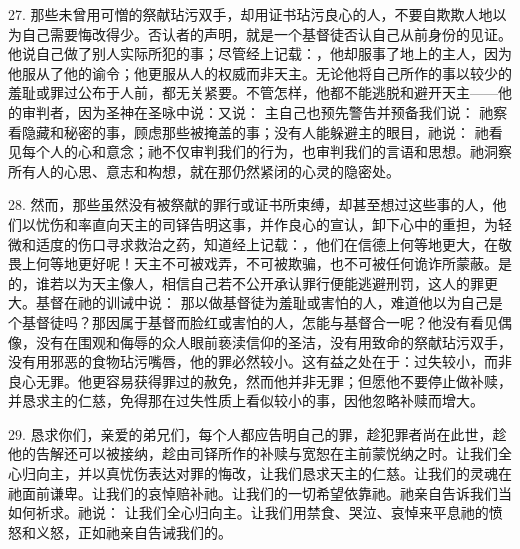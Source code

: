 27. 那些未曾用可憎的祭献玷污双手，却用证书玷污良心的人，不要自欺欺人地以为自己需要悔改得少。否认者的声明，就是一个基督徒否认自己从前身份的见证。他说自己做了别人实际所犯的事；尽管经上记载：，他却服事了地上的主人，因为他服从了他的谕令；他更服从人的权威而非天主。无论他将自己所作的事以较少的羞耻或罪过公布于人前，都无关紧要。不管怎样，他都不能逃脱和避开天主——他的审判者，因为圣神在圣咏中说：又说： 主自己也预先警告并预备我们说： 祂察看隐藏和秘密的事，顾虑那些被掩盖的事；没有人能躲避主的眼目，祂说： 祂看见每个人的心和意念；祂不仅审判我们的行为，也审判我们的言语和思想。祂洞察所有人的心思、意志和构想，就在那仍然紧闭的心灵的隐密处。\par

28. 然而，那些虽然没有被祭献的罪行或证书所束缚，却甚至想过这些事的人，他们以忧伤和率直向天主的司铎告明这事，并作良心的宣认，卸下心中的重担，为轻微和适度的伤口寻求救治之药，知道经上记载：，他们在信德上何等地更大，在敬畏上何等地更好呢！天主不可被戏弄，不可被欺骗，也不可被任何诡诈所蒙蔽。是的，谁若以为天主像人，相信自己若不公开承认罪行便能逃避刑罚，这人的罪更大。基督在祂的训诫中说： 那以做基督徒为羞耻或害怕的人，难道他以为自己是个基督徒吗？那因属于基督而脸红或害怕的人，怎能与基督合一呢？他没有看见偶像，没有在围观和侮辱的众人眼前亵渎信仰的圣洁，没有用致命的祭献玷污双手，没有用邪恶的食物玷污嘴唇，他的罪必然较小。这有益之处在于：过失较小，而非良心无罪。他更容易获得罪过的赦免，然而他并非无罪；但愿他不要停止做补赎，并恳求主的仁慈，免得那在过失性质上看似较小的事，因他忽略补赎而增大。\par

29. 恳求你们，亲爱的弟兄们，每个人都应告明自己的罪，趁犯罪者尚在此世，趁他的告解还可以被接纳，趁由司铎所作的补赎与宽恕在主前蒙悦纳之时。让我们全心归向主，并以真忧伤表达对罪的悔改，让我们恳求天主的仁慈。让我们的灵魂在祂面前谦卑。让我们的哀悼赔补祂。让我们的一切希望依靠祂。祂亲自告诉我们当如何祈求。祂说： 让我们全心归向主。让我们用禁食、哭泣、哀悼来平息祂的愤怒和义怒，正如祂亲自告诫我们的。\par

